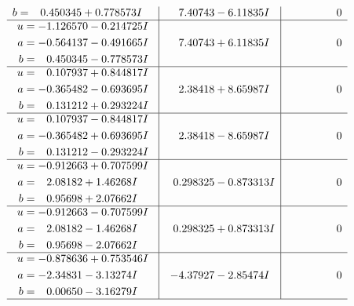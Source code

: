 \documentclass[1p]{elsarticle_modified}
\theoremstyle{definition}
\begin{document}
$$\begin{array}{c|c|c}
\begin{aligned}
b &= \phantom{-}0.450345 + 0.778573 I\end{aligned}
 & \phantom{-}7.40743 - 6.11835 I & \phantom{-0.000000 } 0 \\ \hline\begin{aligned}
u &= -1.126570 - 0.214725 I \\
a &= -0.564137 - 0.491665 I \\
b &= \phantom{-}0.450345 - 0.778573 I\end{aligned}
 & \phantom{-}7.40743 + 6.11835 I & \phantom{-0.000000 } 0 \\ \hline\begin{aligned}
u &= \phantom{-}0.107937 + 0.844817 I \\
a &= -0.365482 - 0.693695 I \\
b &= \phantom{-}0.131212 + 0.293224 I\end{aligned}
 & \phantom{-}2.38418 + 8.65987 I & \phantom{-0.000000 } 0 \\ \hline\begin{aligned}
u &= \phantom{-}0.107937 - 0.844817 I \\
a &= -0.365482 + 0.693695 I \\
b &= \phantom{-}0.131212 - 0.293224 I\end{aligned}
 & \phantom{-}2.38418 - 8.65987 I & \phantom{-0.000000 } 0 \\ \hline\begin{aligned}
u &= -0.912663 + 0.707599 I \\
a &= \phantom{-}2.08182 + 1.46268 I \\
b &= \phantom{-}0.95698 + 2.07662 I\end{aligned}
 & \phantom{-}0.298325 - 0.873313 I & \phantom{-0.000000 } 0 \\ \hline\begin{aligned}
u &= -0.912663 - 0.707599 I \\
a &= \phantom{-}2.08182 - 1.46268 I \\
b &= \phantom{-}0.95698 - 2.07662 I\end{aligned}
 & \phantom{-}0.298325 + 0.873313 I & \phantom{-0.000000 } 0 \\ \hline\begin{aligned}
u &= -0.878636 + 0.753546 I \\
a &= -2.34831 - 3.13274 I \\
b &= \phantom{-}0.00650 - 3.16279 I\end{aligned}
 & -4.37927 - 2.85474 I & \phantom{-0.000000 } 0\\
 \hline 

\end{array}$$
\end{document}
